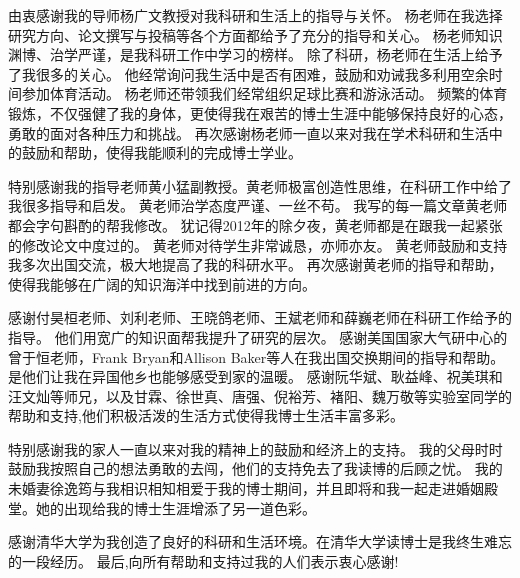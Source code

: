 \begin{acknowledgement}
  由衷感谢我的导师杨广文教授对我科研和生活上的指导与关怀。
  杨老师在我选择研究方向、论文撰写与投稿等各个方面都给予了充分的指导和关心。
  杨老师知识渊博、治学严谨，是我科研工作中学习的榜样。
  除了科研，杨老师在生活上给予了我很多的关心。
  他经常询问我生活中是否有困难，鼓励和劝诫我多利用空余时间参加体育活动。
  杨老师还带领我们经常组织足球比赛和游泳活动。
  频繁的体育锻炼，不仅强健了我的身体，更使得我在艰苦的博士生涯中能够保持良好的心态，勇敢的面对各种压力和挑战。 
  再次感谢杨老师一直以来对我在学术科研和生活中的鼓励和帮助，使得我能顺利的完成博士学业。

  特别感谢我的指导老师黄小猛副教授。黄老师极富创造性思维，在科研工作中给了我很多指导和启发。 
  黄老师治学态度严谨、一丝不苟。
  我写的每一篇文章黄老师都会字句斟酌的帮我修改。
  犹记得2012年的除夕夜，黄老师都是在跟我一起紧张的修改论文中度过的。
  黄老师对待学生非常诚恳，亦师亦友。 
  黄老师鼓励和支持我多次出国交流，极大地提高了我的科研水平。
  再次感谢黄老师的指导和帮助，使得我能够在广阔的知识海洋中找到前进的方向。


  感谢付昊桓老师、刘利老师、王晓鸽老师、王斌老师和薛巍老师在科研工作给予的指导。 
  他们用宽广的知识面帮我提升了研究的层次。
  感谢美国国家大气研中心的曾于恒老师，Frank Bryan和Allison Baker等人在我出国交换期间的指导和帮助。
  是他们让我在异国他乡也能够感受到家的温暖。
  感谢阮华斌、耿益峰、祝美琪和汪文灿等师兄，以及甘霖、徐世真、唐强、倪裕芳、褚阳、魏万敬等实验室同学的帮助和支持,他们积极活泼的生活方式使得我博士生活丰富多彩。 

  
  特别感谢我的家人一直以来对我的精神上的鼓励和经济上的支持。
  我的父母时时鼓励我按照自己的想法勇敢的去闯，他们的支持免去了我读博的后顾之忧。
  我的未婚妻徐逸筠与我相识相知相爱于我的博士期间，并且即将和我一起走进婚姻殿堂。她的出现给我的博士生涯增添了另一道色彩。
  
  感谢清华大学为我创造了良好的科研和生活环境。在清华大学读博士是我终生难忘的一段经历。
  最后,向所有帮助和支持过我的人们表示衷心感谢!

\end{acknowledgement}
